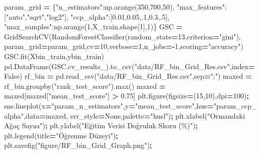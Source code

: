 \documentclass[12pt,twoside]{deuthesis}
\newenvironment{Shaded}{\begin{snugshade}}{\end{snugshade}}
\newcommand{\BuiltInTok}[1]{#1}
\newcommand{\DecValTok}[1]{\textcolor[rgb]{0.00,0.00,0.81}{#1}}
\newcommand{\FloatTok}[1]{\textcolor[rgb]{0.00,0.00,0.81}{#1}}
\newcommand{\NormalTok}[1]{#1}
\newcommand{\OperatorTok}[1]{\textcolor[rgb]{0.81,0.36,0.00}{\textbf{#1}}}
\newcommand{\StringTok}[1]{\textcolor[rgb]{0.31,0.60,0.02}{#1}}
\newcommand{\VariableTok}[1]{\textcolor[rgb]{0.00,0.00,0.00}{#1}}
\begin{document}
\scriptsize
\begin{Shaded}
\begin{Highlighting}[]
\NormalTok{param\_grid }\OperatorTok{=}\NormalTok{ \{}\StringTok{"n\_estimators"}\NormalTok{:np.arange(}\DecValTok{350}\NormalTok{,}\DecValTok{700}\NormalTok{,}\DecValTok{50}\NormalTok{),}
              \StringTok{"max\_features"}\NormalTok{:[}\StringTok{"auto"}\NormalTok{,}\StringTok{"sqrt"}\NormalTok{,}\StringTok{"log2"}\NormalTok{],}
              \StringTok{"ccp\_alpha"}\NormalTok{:[}\FloatTok{0.01}\NormalTok{,}\FloatTok{0.05}\NormalTok{,}\FloatTok{.1}\NormalTok{,}\FloatTok{0.3}\NormalTok{,}\FloatTok{.5}\NormalTok{],}
              \StringTok{"max\_samples"}\NormalTok{:np.arange(}\DecValTok{1}\NormalTok{,X\_train.shape[}\DecValTok{1}\NormalTok{],}\DecValTok{1}\NormalTok{)\}}
\NormalTok{GSC }\OperatorTok{=}\NormalTok{ GridSearchCV(RandomForestClassifier(random\_state}\OperatorTok{=}\DecValTok{13}\NormalTok{,criterion}\OperatorTok{=}\StringTok{"gini"}\NormalTok{),}
\NormalTok{                   param\_grid}\OperatorTok{=}\NormalTok{param\_grid,cv}\OperatorTok{=}\DecValTok{10}\NormalTok{,verbose}\OperatorTok{=}\DecValTok{1}\NormalTok{,n\_jobs}\OperatorTok{={-}}\DecValTok{1}\NormalTok{,scoring}\OperatorTok{=}\StringTok{"accuracy"}\NormalTok{)}
\NormalTok{GSC.fit(Xbin\_train,ybin\_train)                   }
\NormalTok{pd.DataFrame(GSC.cv\_results\_).to\_csv(}\StringTok{"data/RF\_bin\_Grid\_Res.csv"}\NormalTok{,index}\OperatorTok{=}\VariableTok{False}\NormalTok{)}
\NormalTok{rf\_bin }\OperatorTok{=}\NormalTok{ pd.read\_csv(}\StringTok{"data/RF\_bin\_Grid\_Res.csv"}\NormalTok{,sep}\OperatorTok{=}\StringTok{";"}\NormalTok{)}
\NormalTok{maxed }\OperatorTok{=}\NormalTok{ rf\_bin.groupby(}\StringTok{"rank\_test\_score"}\NormalTok{).}\BuiltInTok{max}\NormalTok{()}
\NormalTok{maxed }\OperatorTok{=}\NormalTok{ maxed[maxed[}\StringTok{"mean\_test\_score"}\NormalTok{] }\OperatorTok{\textgreater{}} \FloatTok{0.75}\NormalTok{]}
\NormalTok{plt.figure(figsize}\OperatorTok{=}\NormalTok{(}\DecValTok{15}\NormalTok{,}\DecValTok{10}\NormalTok{),dpi}\OperatorTok{=}\DecValTok{100}\NormalTok{)}\OperatorTok{;}
\NormalTok{sns.lineplot(x}\OperatorTok{=}\StringTok{"param\_n\_estimators"}\NormalTok{,y}\OperatorTok{=}\StringTok{"mean\_test\_score"}\NormalTok{,hue}\OperatorTok{=}\StringTok{"param\_ccp\_alpha"}\NormalTok{,data}\OperatorTok{=}\NormalTok{maxed,}
\NormalTok{             err\_style}\OperatorTok{=}\VariableTok{None}\NormalTok{,palette}\OperatorTok{=}\StringTok{"husl"}\NormalTok{)}\OperatorTok{;}
\NormalTok{plt.xlabel(}\StringTok{"Ormandaki Ağaç Sayısı"}\NormalTok{)}\OperatorTok{;}
\NormalTok{plt.ylabel(}\StringTok{"Eğitim Verisi Doğruluk Skoru (\%)"}\NormalTok{)}\OperatorTok{;}
\NormalTok{plt.legend(title}\OperatorTok{=}\StringTok{"Öğrenme Düzeyi"}\NormalTok{)}\OperatorTok{;}
\NormalTok{plt.savefig(}\StringTok{"figure/RF\_bin\_Grid\_Graph.png"}\NormalTok{)}\OperatorTok{;}
\end{Highlighting}
\end{Shaded}
\end{document}

